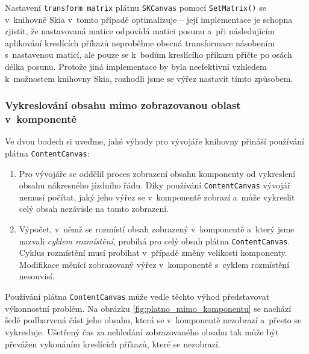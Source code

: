 \newpage
Nastavení \texttt{transform matrix} plátnu \texttt{SKCanvas} pomocí \texttt{SetMatrix()} se \linebreak v~knihovně Skia v~tomto případě optimalizuje -- její implementace je schopna zjistit, že nastavovaná matice odpovídá matici posunu a~při následujícím aplikování kreslících příkazů neproběhne obecná transformace násobením s~nastavenou maticí, ale pouze se k~bodům kreslícího příkazu přičte po osách délka posunu. Protože jiná implementace by byla neefektivní vzhledem k~možnostem knihovny Skia, rozhodli jsme se výřez nastavit tímto způsobem.

\subsubsection*{Vykreslování obsahu mimo zobrazovanou oblast v~komponentě}
\label{kap3:view_element_bounding_check}
Ve dvou bodech si uveďme, jaké výhody pro vývojáře knihovny přináší používání plátna \texttt{ContentCanvas}:

\begin{enumerate}
	\item \label{impl:njr_platno_vyhody_kresleni} Pro vývojáře se oddělil proces zobrazení obsahu komponenty od vykreslení obsahu nákresného jízdního řádu. Díky používání \texttt{ContentCanvas} vývojář nemusí počítat, jaký jeho výřez se v~komponentě zobrazí a~může vykreslit celý obsah nezávisle na tomto zobrazení.
	\item \label{impl:njr_platno_vyhody_rozmisteni} Výpočet, v~němž se rozmístí obsah zobrazený v~komponentě a~který jsme nazvali \textit{cyklem rozmístění}, probíhá pro celý obsah plátna \texttt{ContentCanvas}. Cyklus rozmístění musí probíhat v~případě změny velikosti komponenty. Modifikace měnící zobrazovaný výřez v~komponentě s~cyklem rozmístění nesouvisí.
\end{enumerate}

Používání plátna \texttt{ContentCanvas} může vedle těchto výhod představovat výkonnostní problém. Na obrázku \ref{fig:platno_mimo_komponentu} se nachází šedě podbarvená část jeho obsahu, která se v~komponentě nezobrazí a~přesto se vykresluje. Ušetřený čas za nehledání zobrazovaného obsahu tak může být převážen vykonáním kreslících příkazů, které se nezobrazí.

